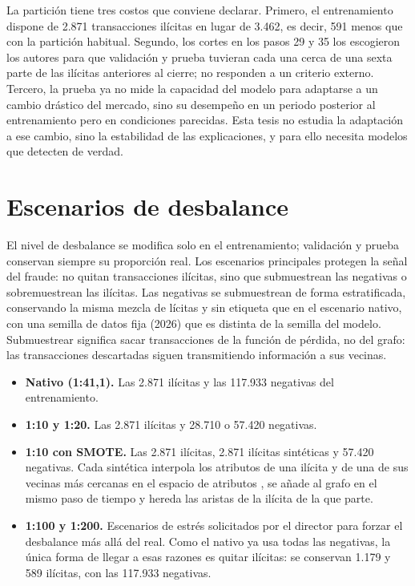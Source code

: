 La partición tiene tres costos que conviene declarar. Primero, el entrenamiento dispone de
2.871 transacciones ilícitas en lugar de 3.462, es decir, 591 menos que con la partición
habitual. Segundo, los cortes en los pasos 29 y 35 los escogieron los autores para que
validación y prueba tuvieran cada una cerca de una sexta parte de las ilícitas anteriores al
cierre; no responden a un criterio externo. Tercero, la prueba ya no mide la capacidad del
modelo para adaptarse a un cambio drástico del mercado, sino su desempeño en un periodo
posterior al entrenamiento pero en condiciones parecidas. Esta tesis no estudia la adaptación
a ese cambio, sino la estabilidad de las explicaciones, y para ello necesita modelos que
detecten de verdad.

\section{Escenarios de desbalance}\label{sec:escenarios}

El nivel de desbalance se modifica solo en el entrenamiento; validación y prueba conservan
siempre su proporción real. Los escenarios principales protegen la señal del fraude: no quitan
transacciones ilícitas, sino que submuestrean las negativas o sobremuestrean las ilícitas. Las
negativas se submuestrean de forma estratificada, conservando la misma mezcla de lícitas y sin
etiqueta que en el escenario nativo, con una semilla de datos fija (2026) que es distinta de la
semilla del modelo. Submuestrear significa sacar transacciones de la función de pérdida, no
del grafo: las transacciones descartadas siguen transmitiendo información a sus vecinas.

\begin{itemize}
  \item \textbf{Nativo (1:41,1).} Las 2.871 ilícitas y las 117.933 negativas del entrenamiento.
  \item \textbf{1:10 y 1:20.} Las 2.871 ilícitas y 28.710 o 57.420 negativas.
  \item \textbf{1:10 con SMOTE.} Las 2.871 ilícitas, 2.871 ilícitas sintéticas y 57.420
        negativas. Cada sintética interpola los atributos de una ilícita y de una de sus
        vecinas más cercanas en el espacio de atributos \cite{Chawla2002SMOTE}, se añade al
        grafo en el mismo paso de tiempo y hereda las aristas de la ilícita de la que parte.
  \item \textbf{1:100 y 1:200.} Escenarios de estrés solicitados por el director para forzar el
        desbalance más allá del real. Como el nativo ya usa todas las negativas, la única forma
        de llegar a esas razones es quitar ilícitas: se conservan 1.179 y 589 ilícitas, con
        las 117.933 negativas.
\end{itemize}

